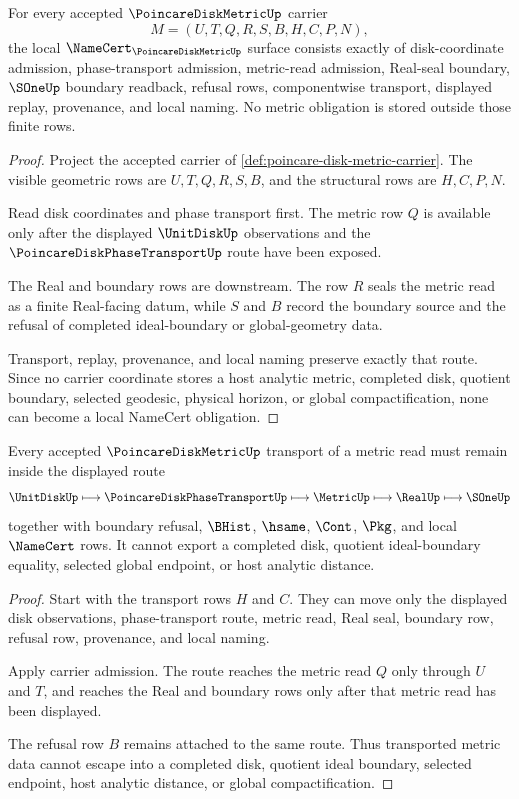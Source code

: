 \begin{theorem}
\label{thm:poincare-disk-metric-namecert-obligations}
For every accepted $\PoincareDiskMetricUp$ carrier
$$
M=(U,T,Q,R,S,B,H,C,P,N),
$$
the local $\NameCert_{\PoincareDiskMetricUp}$ surface consists exactly of disk-coordinate admission, phase-transport admission, metric-read admission, Real-seal boundary, $\SOneUp$ boundary readback, refusal rows, componentwise transport, displayed replay, provenance, and local naming. No metric obligation is stored outside those finite rows.
\end{theorem}
\begin{proof}
Project the accepted carrier of \autoref{def:poincare-disk-metric-carrier}. The visible geometric rows are $U,T,Q,R,S,B$, and the structural rows are $H,C,P,N$.

Read disk coordinates and phase transport first. The metric row $Q$ is available only after the displayed $\UnitDiskUp$ observations and the $\PoincareDiskPhaseTransportUp$ route have been exposed.

The Real and boundary rows are downstream. The row $R$ seals the metric read as a finite Real-facing datum, while $S$ and $B$ record the boundary source and the refusal of completed ideal-boundary or global-geometry data.

Transport, replay, provenance, and local naming preserve exactly that route. Since no carrier coordinate stores a host analytic metric, completed disk, quotient boundary, selected geodesic, physical horizon, or global compactification, none can become a local NameCert obligation.
\end{proof}

\begin{theorem}
\label{thm:poincare-disk-metric-transport-nonescape}
Every accepted $\PoincareDiskMetricUp$ transport of a metric read must remain inside the displayed route
$$
\UnitDiskUp \longmapsto \PoincareDiskPhaseTransportUp \longmapsto \MetricUp \longmapsto \RealUp \longmapsto \SOneUp
$$
together with boundary refusal, $\BHist$, $\hsame$, $\Cont$, $\Pkg$, and local $\NameCert$ rows. It cannot export a completed disk, quotient ideal-boundary equality, selected global endpoint, or host analytic distance.
\end{theorem}
\begin{proof}
Start with the transport rows $H$ and $C$. They can move only the displayed disk observations, phase-transport route, metric read, Real seal, boundary row, refusal row, provenance, and local naming.

Apply carrier admission. The route reaches the metric read $Q$ only through $U$ and $T$, and reaches the Real and boundary rows only after that metric read has been displayed.

The refusal row $B$ remains attached to the same route. Thus transported metric data cannot escape into a completed disk, quotient ideal boundary, selected endpoint, host analytic distance, or global compactification.
\end{proof}

